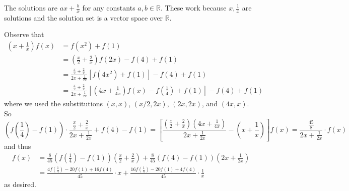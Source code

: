 The solutions are $ax+\frac{b}{x}$ for any constants $a,b\in\mathbb{R}$. These work because $x,\frac{1}{x}$ are solutions and the solution set is a vector space over $\mathbb{R}$.

Observe that
\begin{align*}
	\left(x+\frac{1}{x}\right)f(x)&=f(x^2)+f(1)\\
	&=\left(\frac{x}{2}+\frac{2}{x}\right)f(2x)-f(4)+f(1)\\
	&=\frac{\frac{x}{2}+\frac{2}{x}}{2x+\frac{1}{2x}}\left[f(4x^2)+f(1)\right]-f(4)+f(1)\\
	&=\frac{\frac{x}{2}+\frac{2}{x}}{2x+\frac{1}{2x}}\left[\left(4x+\frac{1}{4x}\right)f(x)-f(\frac{1}{4})+f(1)\right]-f(4)+f(1)
\end{align*}
where we used the substitutions $(x,x)$, $(x/2,2x)$, $(2x,2x)$, and $(4x,x)$. So \[\left(f(\frac{1}{4})-f(1)\right)\cdot\frac{\frac{x}{2}+\frac{2}{x}}{2x+\frac{1}{2x}}+f(4)-f(1)=\left[\frac{\left(\frac{x}{2}+\frac{2}{x}\right)\left(4x+\frac{1}{4x}\right)}{2x+\frac{1}{2x}}-\left(x+\frac{1}{x}\right)\right]f(x)=\frac{\frac{45}{8}}{2x+\frac{1}{2x}}\cdot f(x)\] and thus
\begin{align*}
	f(x)&=\frac{8}{45}\left(f(\frac{1}{4})-f(1)\right)\left(\frac{x}{2}+\frac{2}{x}\right)+\frac{8}{45}\left(f(4)-f(1)\right)\left(2x+\frac{1}{2x}\right)\\
	&=\frac{4f(\frac{1}{4})-20f(1)+16f(4)}{45}\cdot x+\frac{16f(\frac{1}{4})-20f(1)+4f(4)}{45}\cdot\frac{1}{x}
\end{align*}
as desired.